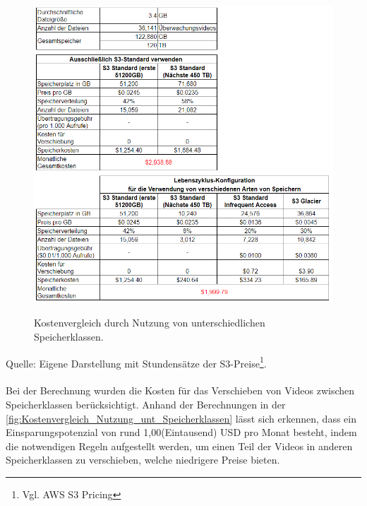 \begin{figure}[h!]
  \centering
  \includegraphics[scale=0.75]{sources/Kostenvergleich_Nutzung_unt_Speicherklassen}
  \caption[Kostenvergleich durch Nutzung von unterschiedlichen Speicherklassen]{}\label{fig:Kostenvergleich_Nutzung_unt_Speicherklassen} 
  Kostenvergleich durch Nutzung von unterschiedlichen Speicherklassen.  
\end{figure}
Quelle: Eigene Darstellung mit Stundensätze der S3-Preise\footnote{Vgl. AWS S3 Pricing\cite{AMZ09}}.
\\\\
Bei der Berechnung wurden die Kosten für das Verschieben von Videos zwischen Speicherklassen berücksichtigt. Anhand der Berechnungen in der \autoref{fig:Kostenvergleich_Nutzung_unt_Speicherklassen} lässt sich erkennen, dass ein Einsparungspotenzial von rund 1,00(Eintausend) USD pro Monat besteht, indem die notwendigen Regeln aufgestellt werden, um einen Teil der Videos in anderen Speicherklassen zu verschieben, welche niedrigere Preise bieten.
\newpage
